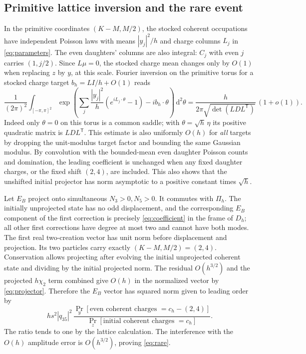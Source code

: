 \documentclass[11pt]{article}
\newcommand{\dd}{\,\mathrm d}
\numberwithin{equation}{section}
\begin{document}
\subsection{Primitive lattice inversion and the rare event}

In the primitive coordinates \((K-M,M/2)\), the stocked
coherent occupations have independent Poisson laws with means
\(|y_j|^2/h\) and charge columns \(L_j\) in
\eqref{eq:parameters}. The even daughters' columns are
also integral: \(C_j\) with even \(j\) carries \((1,j/2)\).
Since \(L\mu=0\), the stocked charge mean changes only
by \(O(1)\) when replacing \(z\) by \(y\), at this scale.
Fourier inversion on the primitive torus for a stocked charge
target \(b_h=LI/h+O(1)\) reads
\[
 \frac1{(2\pi)^2}\int_{[-\pi,\pi]^2}
 \exp\!\left(\sum_j\frac{|y_j|^2}{h}
             (e^{i L_j\cdot\theta}-1)-i b_h\cdot\theta\right)
 \dd^2\theta
 =\frac{h}{2\pi\sqrt{\det(LDL^{\mathsf T})}}\,(1+o(1)).
\]
Indeed only \(\theta=0\) on this torus is a common saddle;
with \(\theta=\sqrt h\,\eta\) its positive quadratic
matrix is \(LDL^{\mathsf T}\). This estimate is also
uniformly \(O(h)\) for \emph{all} targets by dropping
the unit-modulus target factor and bounding the same
Gaussian modulus. By convolution with the bounded-mean
even daughter Poisson counts and domination, the
leading coefficient is unchanged when any fixed daughter
charges, or the fixed shift \((2,4)\), are included.
This also shows that the unshifted initial projector has
norm asymptotic to a positive constant times \(\sqrt h\).

Let \(E_B\) project onto simultaneous \(N_3>0,N_5>0\).
It commutes with \(\Pi_h\). The initially unprojected state
has no odd displacement, and the corresponding \(E_B\) component
of the first correction is precisely \eqref{eq:coefficient}
in the frame of \(D_h\); all other first corrections have
degree at most two and cannot have both modes.
The first real two-creation vector has unit norm before
displacement and projection. Its two particles carry exactly
\((K-M,M/2)=(2,4)\). Conservation allows projecting after
evolving the initial unprojected coherent state and dividing
by the initial projected norm. The residual \(O(h^{3/2})\)
and the projected \(h\chi_2\) term combined give \(O(h)\)
in the normalized vector by \eqref{eq:projector}. Therefore
the \(E_B\) vector has squared norm given to leading order by
\[
 h s^2 |q_{35}|^2\,
 \frac{\Pr_y[\text{even coherent charges }=c_h-(2,4)]}
      {\Pr_z[\text{initial coherent charges }=c_h]} .
\]
The ratio tends to one by the lattice calculation.
The interference with the \(O(h)\) amplitude error is
\(O(h^{3/2})\), proving \eqref{eq:rare}.
\end{document}

